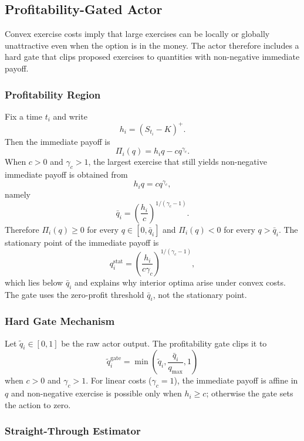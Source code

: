 \documentclass[a4paper,fleqn]{cas-dc}
\begin{document}
\subsection{Profitability-Gated Actor}
\label{sec:profitability_gate}

Convex exercise costs imply that large exercises can be locally or globally unattractive even when the option is in the money. The actor therefore includes a hard gate that clips proposed exercises to quantities with non-negative immediate payoff.

\subsubsection{Profitability Region}

Fix a time $t_i$ and write
\[
    h_i = (S_{t_i} - K)^+.
\]
Then the immediate payoff is
\[
    \Pi_i(q) = h_i q - c q^{\gamma_c}.
\]
When $c > 0$ and $\gamma_c > 1$, the largest exercise that still yields non-negative immediate payoff is obtained from
\[
    h_i q = c q^{\gamma_c},
\]
namely
\begin{equation}
    \label{eq:qbar}
    \bar{q}_i =
    \left(
    \frac{h_i}{c}
    \right)^{1/(\gamma_c - 1)}.
\end{equation}
Therefore $\Pi_i(q) \ge 0$ for every $q \in [0,\bar{q}_i]$ and $\Pi_i(q) < 0$ for every $q > \bar{q}_i$. The stationary point of the immediate payoff is
\[
    q_i^{\mathrm{stat}} =
    \left(
    \frac{h_i}{c \gamma_c}
    \right)^{1/(\gamma_c - 1)},
\]
which lies below $\bar{q}_i$ and explains why interior optima arise under convex costs. The gate uses the zero-profit threshold $\bar{q}_i$, not the stationary point.

\subsubsection{Hard Gate Mechanism}

Let $\tilde{q}_i \in [0,1]$ be the raw actor output. The profitability gate clips it to
\[
    \tilde{q}_i^{\mathrm{gate}} =
    \min\!\left(
    \tilde{q}_i,
    \frac{\bar{q}_i}{q_{\max}},
    1
    \right)
\]
when $c > 0$ and $\gamma_c > 1$. For linear costs ($\gamma_c = 1$), the immediate payoff is affine in $q$ and non-negative exercise is possible only when $h_i \ge c$; otherwise the gate sets the action to zero.

\subsubsection{Straight-Through Estimator}
\end{document}
